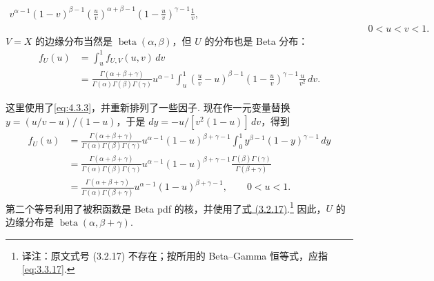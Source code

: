\begin{example}
\begin{equation}
\begin{aligned}
v^{\alpha-1}(1-v)^{\beta-1}\left(\frac uv\right)^{\alpha+\beta-1}\left(1-\frac uv\right)^{\gamma-1}\frac1v,\\
&\hspace{7cm}0<u<v<1.
\end{aligned}
\end{equation}
$V=X$ 的边缘分布当然是 $\operatorname{beta}(\alpha,\beta)$，但 $U$ 的分布也是 Beta 分布：
$$
\begin{aligned}
f_U(u)&=\int_u^1 f_{U,V}(u,v)\,dv\\
&=\frac{\Gamma(\alpha+\beta+\gamma)}{\Gamma(\alpha)\Gamma(\beta)\Gamma(\gamma)}u^{\alpha-1}
\int_u^1\left(\frac uv-u\right)^{\beta-1}\left(1-\frac uv\right)^{\gamma-1}\frac u{v^2}\,dv.
\end{aligned}
$$

这里使用了\eqref{eq:4.3.3}，并重新排列了一些因子. 现在作一元变量替换 $y=(u/v-u)/(1-u)$，于是 $dy=-u/[v^2(1-u)]\,dv$，得到
$$
\begin{aligned}
f_U(u)&=\frac{\Gamma(\alpha+\beta+\gamma)}{\Gamma(\alpha)\Gamma(\beta)\Gamma(\gamma)}u^{\alpha-1}(1-u)^{\beta+\gamma-1}
\int_0^1 y^{\beta-1}(1-y)^{\gamma-1}\,dy\\
&=\frac{\Gamma(\alpha+\beta+\gamma)}{\Gamma(\alpha)\Gamma(\beta)\Gamma(\gamma)}u^{\alpha-1}(1-u)^{\beta+\gamma-1}
\frac{\Gamma(\beta)\Gamma(\gamma)}{\Gamma(\beta+\gamma)}\\
&=\frac{\Gamma(\alpha+\beta+\gamma)}{\Gamma(\alpha)\Gamma(\beta+\gamma)}u^{\alpha-1}(1-u)^{\beta+\gamma-1},\qquad0<u<1.
\end{aligned}
$$
第二个等号利用了被积函数是 Beta pdf 的核，并使用了\hyperref[eq:3.3.17]{式 (3.2.17)}.\footnote{译注：原文式号 (3.2.17) 不存在；按所用的 Beta--Gamma 恒等式，应指\eqref{eq:3.3.17}.} 因此，$U$ 的边缘分布是 $\operatorname{beta}(\alpha,\beta+\gamma)$.
\end{example}
